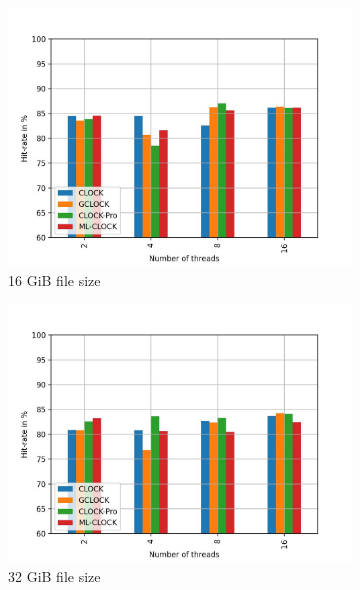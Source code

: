\documentclass[
	12pt,
	a4paper,
	abstract,
	bibliography=totoc,
	chapterprefix,
	headings=openright,
	numbers=endperiod,
	parskip=half,
	twoside,
]{scrreprt}
\begin{document}
\begin{figure}[H]
	\centering
	\begin{subfigure}{0.4\textwidth}
		\includegraphics[width=\textwidth]{multi_16_gb_rw_50to50_zoned.jpg}		
		\caption{16 GiB file size}
		\label{fig:rw_90to10  zipf}
	\end{subfigure}
	\hfill
	\begin{subfigure}{0.4\textwidth}
		\includegraphics[width=\textwidth]{multi_32_gb_rw_50to50_zoned.jpg}		
		\caption{32 GiB file size}
		\label{fig:rw_90to10  normal}
	\end{subfigure}
	\hfill
	\begin{subfigure}{0.4\textwidth}

\end{subfigure}
\end{figure}
\end{document}
